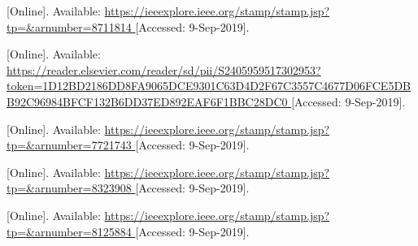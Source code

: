 \begin{thebibliography}{9}


[Online]. Available:
\url{
https://ieeexplore.ieee.org/stamp/stamp.jsp?tp=&arnumber=8711814
}
[Accessed: 9-Sep-2019].



[Online]. Available:
\url{
https://reader.elsevier.com/reader/sd/pii/S2405959517302953?token=1D12BD2186DD8FA9065DCE9301C63D4D2F67C3557C4677D06FCE5DBB92C96984BFCF132B6DD37ED892EAF6F1BBC28DC0
}
[Accessed: 9-Sep-2019].


[Online]. Available:
\url{
https://ieeexplore.ieee.org/stamp/stamp.jsp?tp=&arnumber=7721743
}
[Accessed: 9-Sep-2019].


[Online]. Available:
\url{
https://ieeexplore.ieee.org/stamp/stamp.jsp?tp=&arnumber=8323908
}
[Accessed: 9-Sep-2019].



[Online]. Available:
\url{
https://ieeexplore.ieee.org/stamp/stamp.jsp?tp=&arnumber=8125884
}
[Accessed: 9-Sep-2019].



















\end{thebibliography}
